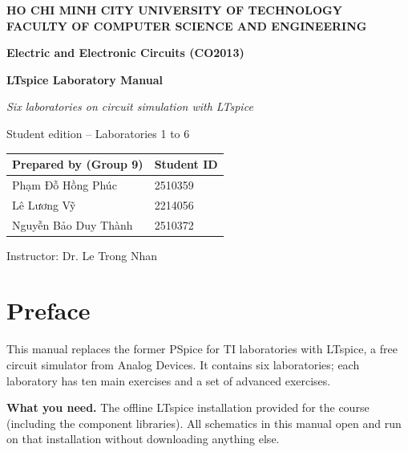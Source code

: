 \documentclass[12pt,twoside]{book}
\newcommand{\GroupNo}{9}
\newcommand{\MemberA}{Phạm Đỗ Hồng Phúc}   \newcommand{\IdA}{2510359}
\newcommand{\MemberB}{Lê Lương Vỹ}          \newcommand{\IdB}{2214056}
\newcommand{\MemberC}{Nguyễn Bảo Duy Thành} \newcommand{\IdC}{2510372}
\begin{document}
\thispagestyle{empty}
\begin{center}
\vspace*{1.2cm}
{\bfseries\large HO CHI MINH CITY UNIVERSITY OF TECHNOLOGY\\
FACULTY OF COMPUTER SCIENCE AND ENGINEERING\par}
\vspace{1.6cm}
{\color{navy}\bfseries Electric and Electronic Circuits (CO2013)\par}
\vspace{1.2cm}
{\bfseries\Huge LTspice Laboratory Manual\par}
\vspace{6pt}
{\itshape\large Six laboratories on circuit simulation with LTspice\par}
\vspace{1.4cm}
{\large Student edition -- Laboratories 1 to 6\par}
\vspace{2.2cm}
\renewcommand{\arraystretch}{1.5}
\begin{tabular}{|p{5.8cm}|p{5.8cm}|}\hline
\textbf{Prepared by (Group \GroupNo)} & \textbf{Student ID}\\ \hline
{\vnfont\MemberA} & \IdA\\ \hline
{\vnfont\MemberB} & \IdB\\ \hline
{\vnfont\MemberC} & \IdC\\ \hline
\end{tabular}
\vfill
Instructor: Dr. Le Trong Nhan
\end{center}
\clearpage

\section*{Preface}
This manual replaces the former PSpice for TI laboratories with LTspice, a free circuit simulator from Analog Devices. It contains six laboratories; each laboratory has ten main exercises and a set of advanced exercises.

\textbf{What you need.} The offline LTspice installation provided for the course (including the component libraries). All schematics in this manual open and run on that installation without downloading anything else.
\end{document}

